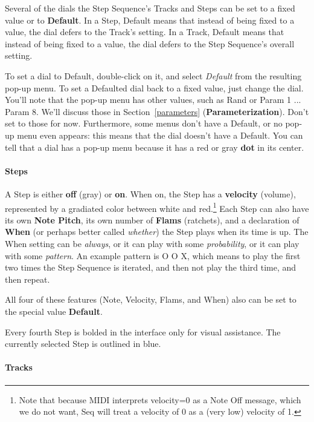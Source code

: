 \documentclass[twoside,10pt]{article}
\begin{document}
Several of the dials the Step Sequence's Tracks and Steps can be set to a fixed value or to {\bf Default}.  In a Step, Default means that instead of being fixed to a value, the dial defers to the Track's setting.  In a Track, Default means that instead of being fixed to a value, the dial defers to the Step Sequence's overall setting.

To set a dial to Default, double-click on it, and select {\it Default} from the resulting pop-up menu.  To set a Defaulted dial back to a fixed value, just change the dial.  You'll note that the pop-up menu has other values, such as Rand or Param 1 ... Param 8.  We'll discuss those in Section~\ref{parameters} ({\bf Parameterization}).  Don't set to those for now.  Furthermore, some menus don't have a Default, or no pop-up menu even appears: this means that the dial doesn't have a Default.  You can tell that a dial has a pop-up menu because it has a red or gray {\bf dot} in its center. 

\paragraph{Steps}

A Step is either {\bf off} (gray) or {\bf on}.  When on, the Step has a {\bf velocity} (volume), represented by a gradiated color between white and red.\footnote{Note that because MIDI interprets velocity=0 as a Note Off message, which we do not want, Seq will treat a velocity of 0 as a (very low) velocity of 1.} Each Step can also have its own {\bf Note Pitch}, its own number of {\bf Flams} (ratchets), and a declaration of {\bf When} (or perhaps better called {\it whether}) the Step plays when its time is up.  The When setting can be {\it always}, or it can play with some {\it probability}, or it can play with some {\it pattern}.  An example pattern is \textsf{O O X}, which means to play the first two times the Step Sequence is iterated, and then not play the third time, and then repeat. 

All four of these features (Note, Velocity, Flams, and When) also can be set to the special value {\bf Default}.   

Every fourth Step is bolded in the interface only for visual assistance.    The currently selected Step is outlined in blue.

\paragraph{Tracks}
\end{document}
